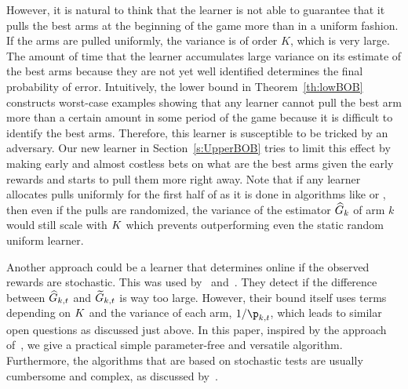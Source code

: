 However, it is natural to 
think that the learner is not able to guarantee that it pulls 
the best arms at the beginning of the game more than in a 
uniform fashion.
If the arms are pulled uniformly, the variance is of order $K$, 
which is very large.
The amount of time that the learner accumulates large variance on its estimate of the best arms because they are not yet well identified  determines the final probability of error. 
Intuitively, the lower bound in Theorem~\ref{th:lowBOB} 
constructs worst-case examples 
showing that any learner cannot pull the best arm more than 
a certain amount in some period of the game because it is difficult to identify the best arms. 
Therefore, 
this learner is susceptible to be tricked by an adversary. Our new learner
in Section~\ref{s:UpperBOB} tries to limit this effect by 
making early and almost costless bets on what are the 
best arms given the early rewards and starts to pull them more right away.
Note that if any learner allocates pulls uniformly for the first half of 
as it is 
done in  algorithms like \SR{} or \SH{}, %
then even if the pulls are randomized,
the variance of the  
estimator  $\widehat{G}_{k}$ of  arm $k$ would still scale with $K$ which prevents 
outperforming even the static random uniform learner.

Another approach could be a learner that determines online 
if the observed rewards are stochastic. This was used by~\cite{Bubeck12BB} and~\cite{Auer16AA}. They 
detect if the difference between $\widehat{G}_{k,t}$
and $\widetilde{G}_{k,t}$
is way too large. However, their bound itself uses  terms 
depending
on $K$ and the variance of each arm, 
$1/\learnerDist_{k,t}$, which leads to similar open questions 
as discussed just above. In this paper, inspired by the approach 
of~\cite{Seldin14OP},  we give a practical 
simple parameter-free and versatile algorithm.  Furthermore,  the algorithms
that are based on stochastic tests are usually cumbersome and complex,  as discussed by~\citealp{Seldin14OP}.